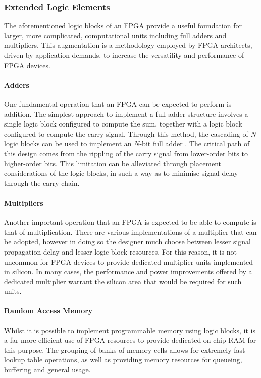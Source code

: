 \subsubsection{Extended Logic Elements}
\label{fpga:architecture:extendedLogic}
The aforementioned logic blocks of an \gls{FPGA} provide a useful foundation for
larger, more complicated, computational units including full adders and
multipliers. This augmentation is a methodology employed by \gls{FPGA}
architects, driven by application demands, to increase the versatility and
performance of \gls{FPGA} devices.

\paragraph{Adders}
\label{fpga:architecture:adders}
One fundamental operation that an \gls{FPGA} can be expected to perform is
addition. The simplest approach to implement a full-adder structure involves a
single logic block configured to compute the sum, together with a logic block
configured to compute the carry signal. Through this method, the cascading of
$N$ logic blocks can be used to implement an $N$-bit full adder
\cite{Hauck:2007}. The critical path of this design comes from the rippling
of the carry signal from lower-order bits to higher-order bits. This limitation
can be alleviated through placement considerations of the logic blocks, in such
a way as to minimise signal delay through the carry chain.

\paragraph{Multipliers}
\label{fpga:architecture:multipliers}
Another important operation that an \gls{FPGA} is expected to be able to compute
is that of multiplication. There are various implementations of a multiplier
that can be adopted, however in doing so the designer much choose between
lesser signal propagation delay and lesser logic block resources. For this
reason, it is not uncommon for \gls{FPGA} devices to provide dedicated
multiplier units implemented in silicon. In many cases, the performance and
power improvements offered by a dedicated multiplier warrant the silicon area
that would be required for such units.

\paragraph{Random Access Memory}
\label{fpga:architecture:ram}
Whilst it is possible to implement programmable memory using logic blocks,
it is a far more efficient use of \gls{FPGA} resources to provide dedicated
on-chip \gls{RAM} for this purpose. The grouping of banks of memory cells allows
for extremely fast lookup table operations, as well as providing memory
resources for queueing, buffering and general usage.

